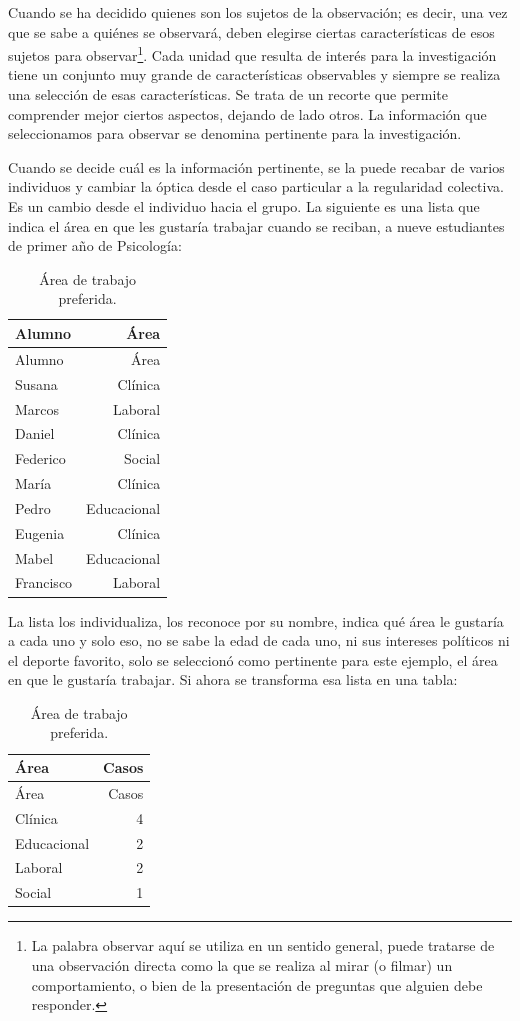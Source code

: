 \documentclass[]{book}
\let\rmarkdownfootnote\footnote%
\def\footnote{\protect\rmarkdownfootnote}
\begin{document}
Cuando se ha decidido quienes son los sujetos de la observación; es decir, una vez que se sabe a quiénes se observará, deben elegirse ciertas características de esos sujetos para observar\footnote{La palabra observar aquí se utiliza en un sentido general, puede tratarse de una observación directa como la que se realiza al mirar (o filmar) un comportamiento, o bien de la presentación de preguntas que alguien debe responder.}. Cada unidad que resulta de interés para la investigación tiene un conjunto muy grande de características observables y siempre se realiza una selección de esas características. Se trata de un recorte que permite comprender mejor ciertos aspectos, dejando de lado otros. La información que seleccionamos para observar se denomina pertinente para la investigación.

Cuando se decide cuál es la información pertinente, se la puede recabar de varios individuos y cambiar la óptica desde el caso particular a la regularidad colectiva. Es un cambio desde el individuo hacia el grupo. La siguiente es una lista que indica el área en que les gustaría trabajar cuando se reciban, a nueve estudiantes de primer año de Psicología:

\begin{longtable}[]{@{}lr@{}}
\caption{\label{tab:unnamed-chunk-22}Área de trabajo preferida.}\tabularnewline
\toprule
Alumno & Área\tabularnewline
\midrule
\endfirsthead
\toprule
Alumno & Área\tabularnewline
\midrule
\endhead
Susana & Clínica\tabularnewline
Marcos & Laboral\tabularnewline
Daniel & Clínica\tabularnewline
Federico & Social\tabularnewline
María & Clínica\tabularnewline
Pedro & Educacional\tabularnewline
Eugenia & Clínica\tabularnewline
Mabel & Educacional\tabularnewline
Francisco & Laboral\tabularnewline
\bottomrule
\end{longtable}

La lista los individualiza, los reconoce por su nombre, indica qué área le gustaría a cada uno y solo eso, no se sabe la edad de cada uno, ni sus intereses políticos ni el deporte favorito, solo se seleccionó como pertinente para este ejemplo, el área en que le gustaría trabajar. Si ahora se transforma esa lista en una tabla:

\begin{longtable}[]{@{}lr@{}}
\caption{\label{tab:unnamed-chunk-23}Área de trabajo preferida.}\tabularnewline
\toprule
Área & Casos\tabularnewline
\midrule
\endfirsthead
\toprule
Área & Casos\tabularnewline
\midrule
\endhead
Clínica & 4\tabularnewline
Educacional & 2\tabularnewline
Laboral & 2\tabularnewline
Social & 1\tabularnewline
\bottomrule
\end{longtable}
\end{document}

